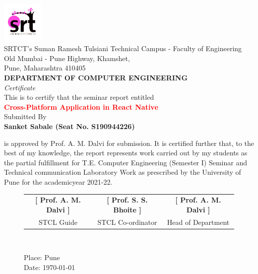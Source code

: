 \documentclass[./seminar_report.tex]{subfiles}
\begin{document}
 \includegraphics[width=0.15\textwidth]{logo}
\\
{\Large SRTCT's Suman Ramesh Tulsiani Technical Campus - Faculty of Engineering}
\\
{\small Old Mumbai - Pune Highway, Khamshet,}
\\
{\small Pune, Maharashtra 410405}
\\
{\large \textbf{DEPARTMENT OF COMPUTER ENGINEERING}}
\\
{\LARGE \textit{Certificate}}
\\
{\large This is to certify that the seminar report entitled}
\\
{\large \textbf{ \textcolor{red}{Cross-Platform Application in React Native}}}
\\
{\large Submitted By}
\\
{\large \textbf{Sanket Sabale (Seat No. S190944226)}}
\\
\begin{FlushLeft}
 is approved by Prof. A. M. Dalvi for submission. It is certified further that, to the
best of my knowledge, the report represents work carried out by my
students as the partial fulfillment for T.E. Computer Engineering
(Semester I) Seminar and Technical communication Laboratory Work as 
prescribed by the University of Pune for the academicyear 2021-22.
\\

\end{FlushLeft}
\begin{figure}[b]
\begin{tabular}{ c c c }
 \textbf{[ Prof. A. M. Dalvi ]} & \textbf{[ Prof. S. S. Bhoite ]} &  \textbf{[ Prof. A. M. Dalvi ]}  \\ 
 STCL Guide & STCL Co-ordinator & Head of Department     
\end{tabular}
\\
\begin{FlushLeft}
{\small Place: Pune }\\
{\small Date: \today }
\end{FlushLeft}
\end{figure}
\end{document}
